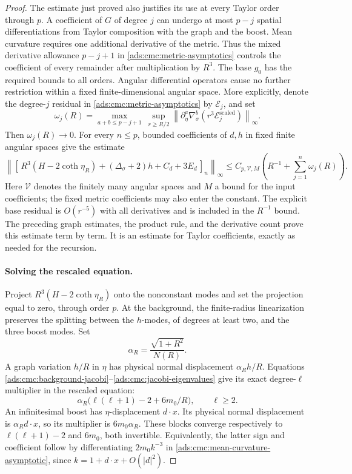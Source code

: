 \begin{proof}
The estimate just proved also justifies its use at every Taylor
order through \(p\).
A coefficient of \(G\) of degree \(j\) can undergo at most \(p-j\)
spatial differentiations from Taylor composition with the graph and
the boost.  Mean curvature requires one additional derivative of
the metric.  Thus the mixed derivative allowance \(p-j+1\) in
\eqref{ads:cmc:metric-asymptotics} controls the coefficient of every
remainder after multiplication by \(R^3\).
The base \(g_0\) has the required bounds to all orders.
Angular differential operators cause no further restriction within
a fixed finite-dimensional angular space.
More explicitly, denote the degree-\(j\) residual in
\eqref{ads:cmc:metric-asymptotics} by \(\mathcal E_j\), and set
\[
 \omega_j(R)=
 \max_{a+b\le p-j+1}\ 
 \sup_{r\ge R/2}
 \left\|\partial_\eta^a\nabla_\sigma^b
              (r^3\mathcal E_j^{\mathrm{scaled}})\right\|_\infty.
\]
Then \(\omega_j(R)\to0\).
For every \(n\le p\), bounded coefficients of \(d,h\) in fixed finite
angular spaces give the estimate
\[
 \left\|[\,
 R^3(H-2\coth\eta_R)+(\Delta_\sigma+2)h+C_d+3E_d\,]_n
       \right\|_\infty
 \le C_{p,\mathcal V,M}
       \left(R^{-1}+\sum_{j=1}^n\omega_j(R)\right).
\]
Here \(\mathcal V\) denotes the finitely many angular spaces and \(M\)
a bound for the input coefficients; the fixed metric coefficients
may also enter the constant.  The explicit base residual is
\(O(r^{-5})\) with all derivatives and is included in the
\(R^{-1}\) bound.  The preceding graph estimates, the product rule,
and the derivative count prove this estimate term by term.
It is an estimate for Taylor coefficients, exactly as needed for
the recursion.

\paragraph{Solving the rescaled equation.}
Project \(R^3(H-2\coth\eta_R)\) onto the nonconstant modes and set the
projection equal to zero, through order \(p\).
At the background, the finite-radius linearization preserves the
splitting between the \(h\)-modes, of degrees at least two, and the
three boost modes.
Set
\[
 \alpha_R=\frac{\sqrt{1+R^2}}{N(R)}.
\]
A graph variation \(h/R\) in \(\eta\) has physical normal
displacement \(\alpha_Rh/R\).  Equations
\eqref{ads:cmc:background-jacobi}--\eqref{ads:cmc:jacobi-eigenvalues} give its
exact degree-\(\ell\) multiplier in the rescaled equation:
\begin{equation}\label{ads:cmc:scaled-inverse-blocks}
 \alpha_R\bigl(\ell(\ell+1)-2+6m_0/R\bigr),
 \qquad \ell\ge2.
\end{equation}
An infinitesimal boost has \(\eta\)-displacement \(d\cdot x\).
Its physical normal displacement is \(\alpha_Rd\cdot x\), so its
multiplier is \(6m_0\alpha_R\).
These blocks converge respectively to \(\ell(\ell+1)-2\) and
\(6m_0\), both invertible.
Equivalently, the latter sign and coefficient follow by
differentiating \(2m_0k^{-3}\) in
\eqref{ads:cmc:mean-curvature-asymptotic}, since
\(k=1+d\cdot x+O(|d|^2)\).


\end{proof}
